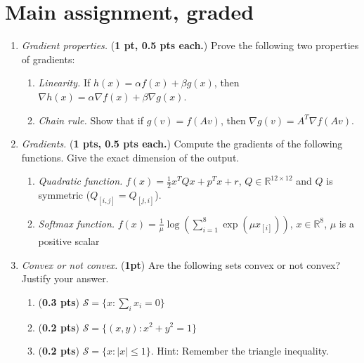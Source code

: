 \documentclass{article}
\newcommand{\R}{\mathbb R}
\newcommand{\idx}[1]{_{[#1]}}
\newcommand{\mS}{\mathcal S}
\newcommand{\showpoints}[1]{(\textbf{#1})}
\begin{document}
\section*{Main assignment, graded}
\begin{enumerate}


\item \emph{Gradient properties.} \showpoints{1 pt, 0.5 pts each.} Prove the following two properties of gradients:
\begin{enumerate}
\item \emph{Linearity.} If $h(x) = \alpha f(x) + \beta g(x)$, then 
$\nabla h(x) = \alpha \nabla f(x) + \beta \nabla g(x).$


\item \emph{Chain rule.} Show that if $g(v) = f(Av)$, then $\nabla g(v) = A^T\nabla f(Av)$.


\end{enumerate}

\item \emph{Gradients.} \showpoints{1 pts, 0.5 pts each.}  Compute the gradients of the following functions. Give the exact dimension of the output.

\begin{enumerate}

\item \emph{Quadratic function.}  $f(x) = \frac{1}{2}x^TQx + p^Tx + r$, $Q\in \R^{12\times 12}$ and $Q$ is symmetric ($Q\idx{i,j} = Q\idx{j,i}$).

\item \emph{Softmax function.} $f(x) =\frac{1}{\mu} \log(\sum_{i=1}^8 \exp(\mu x\idx{i}))$, $x\in \R^8$, $\mu$ is a positive scalar

\end{enumerate}




\item  \emph{Convex or not convex. } \showpoints{1pt} Are the following sets convex or not convex? Justify your answer.

\begin{enumerate}
\item \showpoints{0.3 pts} $\mS = \{x : \sum_i x_i = 0\}$




\item \showpoints{0.2 pts} $\mS = \{(x,y) : x^2+y^2 = 1\}$



\item \showpoints{0.2 pts} $\mS = \{x : |x| \leq 1\}$.
Hint: Remember the triangle inequality.




\end{enumerate}
\end{enumerate}
\end{document}
